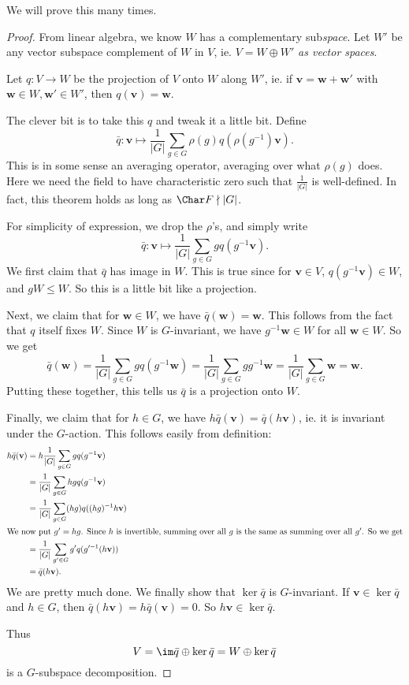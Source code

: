 \documentclass[a4paper]{article}
\begin{document}
We will prove this many times.
\begin{proof}
  From linear algebra, we know $W$ has a complementary sub\emph{space}. Let $W'$ be any vector subspace complement of $W$ in $V$, ie. $V = W \oplus W'$ \emph{as vector spaces}.

  Let $q: V \to W$ be the projection of $V$ onto $W$ along $W'$, ie. if $\mathbf{v} = \mathbf{w} + \mathbf{w}'$ with $\mathbf{w} \in W, \mathbf{w}' \in W'$, then $q(\mathbf{v}) = \mathbf{w}$.

  The clever bit is to take this $q$ and tweak it a little bit. Define
  \[
    \bar{q}: \mathbf{v} \mapsto \frac{1}{|G|} \sum_{g \in G} \rho(g) q (\rho(g^{-1})\mathbf{v}).
  \]
  This is in some sense an averaging operator, averaging over what $\rho(g)$ does. Here we need the field to have characteristic zero such that $\frac{1}{|G|}$ is well-defined. In fact, this theorem holds as long as $\Char F \nmid |G|$.

  For simplicity of expression, we drop the $\rho$'s, and simply write
  \[
    \bar{q}: \mathbf{v} \mapsto \frac{1}{|G|} \sum_{g \in G} g q (g^{-1}\mathbf{v}).
  \]
  We first claim that $\bar{q}$ has image in $W$. This is true since for $\mathbf{v} \in V$, $q(g^{-1} \mathbf{v}) \in W$, and $gW \leq W$. So this is a little bit like a projection.

  Next, we claim that for $\mathbf{w} \in W$, we have $\bar{q}(\mathbf{w}) = \mathbf{w}$. This follows from the fact that $q$ itself fixes $W$. Since $W$ is $G$-invariant, we have $g^{-1} \mathbf{w} \in W$ for all $\mathbf{w} \in W$. So we get
  \[
    \bar{q}(\mathbf{w}) = \frac{1}{|G|} \sum_{g \in G} g q(g^{-1}\mathbf{w}) = \frac{1}{|G|} \sum_{g \in G} gg^{-1}\mathbf{w} = \frac{1}{|G|} \sum_{g \in G}\mathbf{w} = \mathbf{w}.
  \]
  Putting these together, this tells us $\bar{q}$ is a projection onto $W$.

  Finally, we claim that for $h \in G$, we have $h \bar{q}(\mathbf{v}) = \bar{q}(h\mathbf{v})$, ie. it is invariant under the $G$-action. This follows easily from definition:
  \begin{align*}
    h \bar{q} (\mathbf{v}) &= h\frac{1}{|G|} \sum_{g \in G} g q (g^{-1}\mathbf{v})\\
    &= \frac{1}{|G|} \sum_{g \in G} hg q (g^{-1} \mathbf{v})\\
    &= \frac{1}{|G|} \sum_{g \in G} (hg) q ((hg)^{-1} h\mathbf{v})\\
    \intertext{We now put $g' = hg$. Since $h$ is invertible, summing over all $g$ is the same as summing over all $g'$. So we get}
    &= \frac{1}{|G|} \sum_{g' \in G} g' q(g'^{-1}(h\mathbf{v}))\\
    &= \bar{q} (h\mathbf{v}).
  \end{align*}
  We are pretty much done. We finally show that $\ker \bar{q}$ is $G$-invariant. If $\mathbf{v} \in \ker \bar{q}$ and $h \in G$, then $\bar{q}(h\mathbf{v}) = h\bar{q}(\mathbf{v}) = 0$. So $h\mathbf{v} \in \ker \bar{q}$.

  Thus
  \[
    V = \im \bar{q} \oplus \ker \bar{q} = W \oplus \ker\bar{q}
  \]
  is a $G$-subspace decomposition.
\end{proof}
\end{document}
